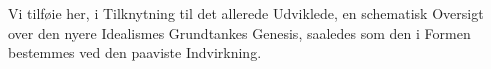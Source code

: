 Vi tilføie her, i Tilknytning til det allerede Udviklede,
en schematisk Oversigt over den nyere Idealismes Grundtankes
Genesis, saaledes som den i Formen bestemmes ved den
paaviste Indvirkning.
%
%
%
%
%
%
